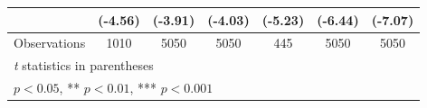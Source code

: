 {\begin{tabular}{l*{6}{c}}
                    &     (-4.56)         &     (-3.91)         &     (-4.03)         &     (-5.23)         &     (-6.44)         &     (-7.07)         \\
\hline
Observations        &        1010         &        5050         &        5050         &         445         &        5050         &        5050         \\
\hline\hline
\multicolumn{7}{l}{\footnotesize \textit{t} statistics in parentheses}\\
\multicolumn{7}{l}{\footnotesize * \(p<0.05\), ** \(p<0.01\), *** \(p<0.001\)}\\
\end{tabular}
}
